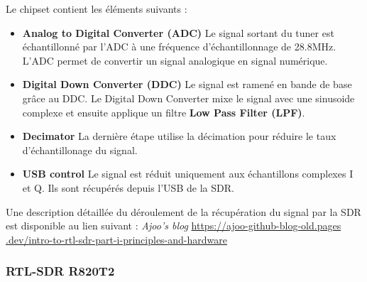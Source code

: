 \vspace{0.1cm}

Le chipset contient les éléments suivants :
\begin{itemize}
\item \textbf{Analog to Digital Converter (ADC)} Le signal sortant du tuner est échantillonné par l'ADC à une fréquence d'échantillonnage de 28.8MHz. L'ADC permet de convertir un signal analogique en signal numérique.
\item \textbf{Digital Down Converter (DDC)} Le signal est ramené en bande de base grâce au DDC. Le Digital Down Converter  mixe le signal avec une sinusoide complexe et ensuite applique un filtre \textbf{Low Pass Filter (LPF)}. 
\item \textbf{Decimator} La dernière étape utilise la décimation pour réduire le taux d'échantillonage du signal.
\item \textbf{USB control} Le signal est réduit uniquement aux échantillons complexes I et Q. Ils sont récupérés depuis l'USB de la SDR.
\end{itemize}

\vspace{0.1cm}

Une description détaillée du déroulement de la récupération du signal par la SDR est disponible au lien suivant : \textit{Ajoo's blog} \href{https://ajoo-github-blog-old.pages.dev/intro-to-rtl-sdr-part-i-principles-and-hardware}{https://ajoo-github-blog-old.pages
.dev/intro-to-rtl-sdr-part-i-principles-and-hardware}




\subsubsection{RTL-SDR R820T2}

